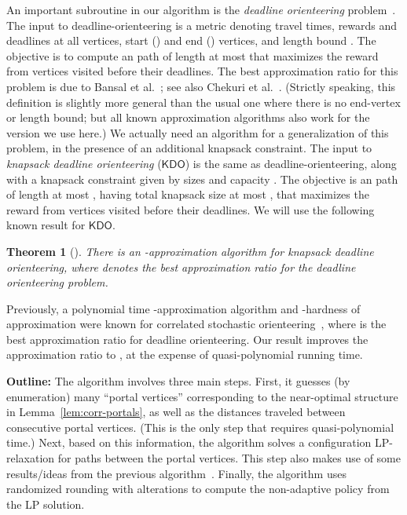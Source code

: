 \documentclass[11pt,letterpaper]{article}
\newtheorem{theorem}{Theorem}[section]
\numberwithin{algorithm}{section}
\newcommand{\kdo}{\ensuremath{\mathsf{KDO}}\xspace}
\begin{document}
An important subroutine in our algorithm is the {\em deadline orienteering} problem~\cite{BBCM04}. The input to deadline-orienteering is a metric  denoting travel times, rewards  and deadlines  at all vertices, start () and end () vertices, and length bound . The objective is to compute an  path of length at most  that maximizes the reward from vertices visited before their deadlines. The best approximation ratio for this problem is   due to Bansal et al.~\cite{BBCM04}; see also Chekuri et al.~\cite{CKP08}. (Strictly speaking, this definition is slightly more general than the usual one where there is no end-vertex or length bound; but all known approximation algorithms also work for the version we use here.) We actually need an algorithm for a generalization of this problem, in the presence of an additional knapsack constraint. The input to {\em knapsack deadline orienteering} (\kdo) is the same as deadline-orienteering, along with a knapsack constraint given by sizes  and capacity . The objective is an   path of length at most , having total knapsack size at most , that maximizes the reward from vertices visited before their deadlines. We will use the following known result for \kdo.
\begin{theorem}[\cite{GKNR12}] \label{thm:kdo} There is an -approximation algorithm for knapsack deadline orienteering, where  denotes the best approximation ratio for the deadline orienteering problem.
\end{theorem}



Previously, a polynomial time -approximation algorithm and -hardness of approximation were known for correlated stochastic orienteering~\cite{GKNR12}, where  is the best approximation ratio for deadline orienteering. Our result improves the approximation ratio to , at the expense of quasi-polynomial running time.





{\bf Outline:} The algorithm involves three main steps. First, it guesses (by enumeration)  many ``portal vertices'' corresponding to the near-optimal structure in Lemma~\ref{lem:corr-portals}, as well as the distances traveled between consecutive portal vertices. (This is the only step that requires quasi-polynomial time.) Next, based on this information, the algorithm solves a configuration LP-relaxation for paths between the portal vertices. This step also makes use of some results/ideas from the previous algorithm~\cite{GKNR12}. Finally, the algorithm uses randomized rounding with alterations to compute the non-adaptive policy from the LP solution.
\end{document}
